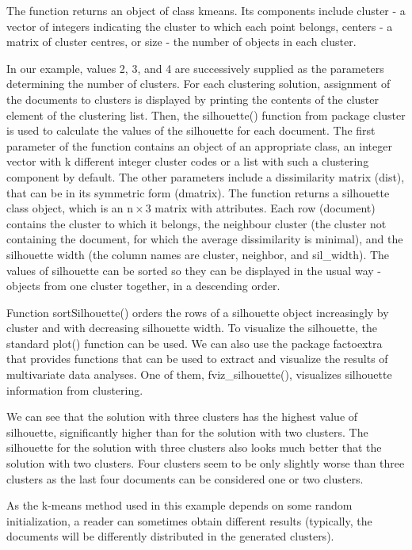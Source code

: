 The function returns an object of class kmeans. Its components include cluster - a vector of integers indicating the cluster to which each point belongs, centers - a matrix of cluster centres, or size - the number of objects in each cluster.

In our example, values 2, 3, and 4 are successively supplied as the parameters determining the number of clusters. For each clustering solution, assignment of the documents to clusters is displayed by printing the contents of the cluster element of the clustering list. Then, the silhouette() function from package cluster is used to calculate the values of the silhouette for each document. The first parameter of the function contains an object of an appropriate class, an integer vector with k different integer cluster codes or a list with such a clustering component by default. The other parameters include a dissimilarity matrix (dist), that can be in its symmetric form (dmatrix). The function returns a silhouette class object, which is an $\mathrm{n} \times 3$ matrix with attributes. Each row (document) contains the cluster to which it belongs, the neighbour cluster (the cluster not containing the document, for which the average dissimilarity is minimal), and the silhouette width (the column names are cluster, neighbor, and sil\_width). The values of silhouette can be sorted so they can be displayed in the usual way - objects from one cluster together, in a descending order.

Function sortSilhouette() orders the rows of a silhouette object increasingly by cluster and with decreasing silhouette width. To visualize the silhouette, the standard plot() function can be used. We can also use the package factoextra that provides functions that can be used to extract and visualize the results of multivariate data analyses. One of them, fviz\_silhouette(), visualizes silhouette information from clustering.

We can see that the solution with three clusters has the highest value of silhouette, significantly higher than for the solution with two clusters. The silhouette for the solution with three clusters also looks much better that the solution with two clusters. Four clusters seem to be only slightly worse than three clusters as the last four documents can be considered one or two clusters.

As the k-means method used in this example depends on some random initialization, a reader can sometimes obtain different results (typically, the documents will be differently distributed in the generated clusters).

